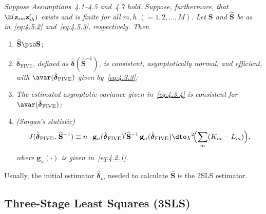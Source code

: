 \begin{proposition}
\label{prop:4.4}
\textit{Suppose Assumptions~4.1--4.5 and~4.7 hold. Suppose, furthermore, that\/
$\E(\mathbf{z}_{im} \mathbf{z}_{ih}')$ exists and is finite for all
$m, h$ $(= 1, 2, \ldots, M)$.
Let\/ $\mathbf{S}$ and\/ $\widehat{\mathbf{S}}$ be as in~\eqref{eq:4.5.2}
and~\eqref{eq:4.5.3}, respectively. Then}
\begin{enumerate}[label=(\alph*)]
\item $\widehat{\mathbf{S}} \pto \mathbf{S}$;
\item $\hat{\boldsymbol{\delta}}_{\mathrm{FIVE}}$, \textit{defined as\/
$\hat{\boldsymbol{\delta}}(\widehat{\mathbf{S}}^{-1})$, is consistent,
asymptotically normal, and efficient, with\/
$\avar(\hat{\boldsymbol{\delta}}_{\mathrm{FIVE}})$ given by~\eqref{eq:4.3.3};}
\item \textit{The estimated asymptotic variance given in~\eqref{eq:4.3.4} is
consistent for\/ $\avar(\hat{\boldsymbol{\delta}}_{\mathrm{FIVE}})$;}
\item \textit{(Sargan's statistic)}
\[
J(\hat{\boldsymbol{\delta}}_{\mathrm{FIVE}},\, \widehat{\mathbf{S}}^{-1})
\equiv n \cdot \mathbf{g}_n(\hat{\boldsymbol{\delta}}_{\mathrm{FIVE}})'
\widehat{\mathbf{S}}^{-1}\, \mathbf{g}_n(\hat{\boldsymbol{\delta}}_{\mathrm{FIVE}})
\dto \chi^2\!\Bigl(\sum_m (K_m - L_m)\Bigr),
\]
\textit{where\/ $\mathbf{g}_n(\cdot)$ is given in~\eqref{eq:4.2.1}.}
\end{enumerate}
\end{proposition}

Usually, the initial estimator $\hat{\boldsymbol{\delta}}_m$ needed to calculate
$\widehat{\mathbf{S}}$ is the 2SLS estimator.

\subsection*{Three-Stage Least Squares (3SLS)}

